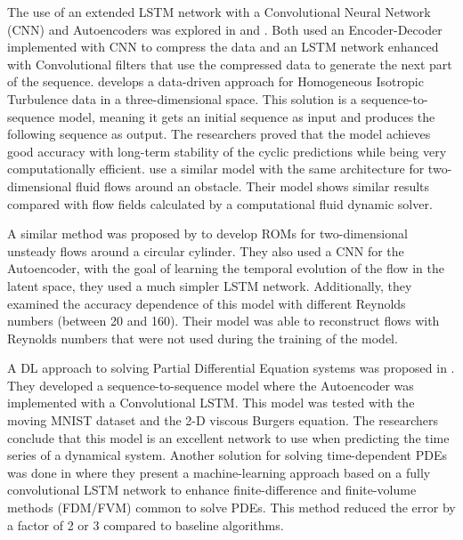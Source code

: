 The use of an extended LSTM network with a Convolutional Neural Network (CNN) and Autoencoders was explored in \cite{mohan_compressed_2019} and \cite{han_new_2019}. Both used an Encoder-Decoder implemented with CNN to compress the data and an LSTM network enhanced with Convolutional filters that use the compressed data to generate the next part of the sequence. \cite{mohan_compressed_2019} develops a data-driven approach for Homogeneous Isotropic Turbulence data in a three-dimensional space. This solution is a sequence-to-sequence model, meaning it gets an initial sequence as input and produces the following sequence as output. The researchers proved that the model achieves good accuracy with long-term stability of the cyclic predictions while being very computationally efficient. \cite{han_new_2019} use a similar model with the same architecture for two-dimensional fluid flows around an obstacle. Their model shows similar results compared with flow fields calculated by a computational fluid dynamic solver. 

A similar method was proposed by \cite{hasegawa_cnn-lstm_2020} to develop ROMs for two-dimensional unsteady flows around a circular cylinder. They also used a CNN for the Autoencoder, with the goal of learning the temporal evolution of the flow in the latent space, they used a much simpler LSTM network. Additionally, they examined the accuracy dependence of this model with different Reynolds numbers (between 20 and 160). Their model was able to reconstruct flows with Reynolds numbers that were not used during the training of the model.

A DL approach to solving Partial Differential Equation systems was proposed in \cite{kakka_sequence_2022}. They developed a sequence-to-sequence model where the Autoencoder was implemented with a Convolutional LSTM. This model was tested with the moving MNIST dataset and the 2-D viscous Burgers equation. The researchers conclude that this model is an excellent network to use when predicting the time series of a dynamical system. Another solution for solving time-dependent PDEs was done in \cite{stevens_finitenet_2020} where they present a machine-learning approach based on a fully convolutional LSTM network to enhance finite-difference and finite-volume methods (FDM/FVM) common to solve PDEs. This method reduced the error by a factor of 2 or 3 compared to baseline algorithms.

